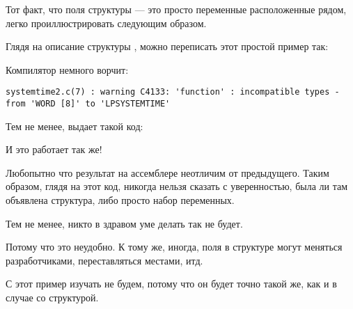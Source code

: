 Тот факт, что поля структуры --- это просто переменные расположенные рядом, легко проиллюстрировать следующим образом.%

Глядя на описание структуры , можно переписать этот простой пример так:%



Компилятор немного ворчит:

\begin{lstlisting}
systemtime2.c(7) : warning C4133: 'function' : incompatible types - from 'WORD [8]' to 'LPSYSTEMTIME'
\end{lstlisting}

Тем не менее, выдает такой код:



И это работает так же!

Любопытно что результат на ассемблере неотличим от предыдущего.
Таким образом, глядя на этот код, 
никогда нельзя сказать с уверенностью, была ли там объявлена структура, либо просто набор переменных.

Тем не менее, никто в здравом уме делать так не будет.

Потому что это неудобно. 
К тому же, иногда, поля в структуре могут меняться разработчиками, переставляться местами, итд.

С \olly этот пример изучать не будем, потому что он будет точно такой же, как и в случае со структурой.

